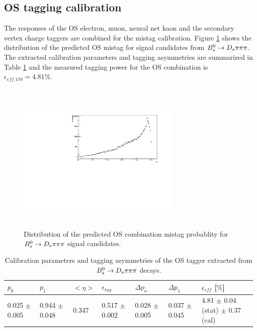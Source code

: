 \subsection{OS tagging calibration}
\label{subsec: OScalibration}
The responses of the OS electron, muon, neural net kaon and the secondary vertex charge taggers are combined for the mistag calibration. 
Figure \ref{fig:OSdistribution} shows the distribution of the predicted OS mistag for signal candidates from ${{B}^0_{s}}\rightarrow{\ensuremath{{D}_{s}}}{\ensuremath{\pi}}{\ensuremath{\pi}}{\ensuremath{\pi}}$. 
The extracted calibration parameters and tagging asymmetries are summarized in Table \ref{table: OScalibration} and the measured tagging power for the OS combination is $\epsilon_{eff,OS} = 4.81 \%$.

\begin{figure}[h]
\centering
\includegraphics[height=7.4cm,width=0.7\textwidth]{figs/Tagging/OS_combination_etaDis.pdf}
\caption{Distribution of the predicted OS combination mistag probablity for ${{B}^0_{s}}\rightarrow{\ensuremath{{D}_{s}}}{\ensuremath{\pi}}{\ensuremath{\pi}}{\ensuremath{\pi}}$ signal candidates.}
\label{fig:OSdistribution}
\end{figure}


\begin{table}[h]
\centering
\scriptsize
 \begin{tabular}{l l l l | l l | l}
\hline
$p_{0}$ & $p_{1}$ & $<\eta>$ & $\epsilon_{tag}$ & $\Delta p_{o}$ & $\Delta p_{1}$ & $\epsilon_{eff}$ [$\%$] \\
\hline
0.025 $\pm$0.005  & 0.944 $\pm$ 0.048 & 0.347 & 0.517 $\pm$ 0.002 & 0.028 $\pm$ 0.005 & 0.037 $\pm$ 0.045 & 4.81 $\pm$ 0.04 (stat) $\pm$ 0.37 (cal) \\
\hline
\end{tabular}
\caption{Calibration parameters and tagging asymmetries of the OS tagger extracted from ${{B}^0_{s}}\rightarrow{\ensuremath{{D}_{s}}}{\ensuremath{\pi}}{\ensuremath{\pi}}{\ensuremath{\pi}}$ decays.}
\label{table: OScalibration}
\normalsize
\end{table}


